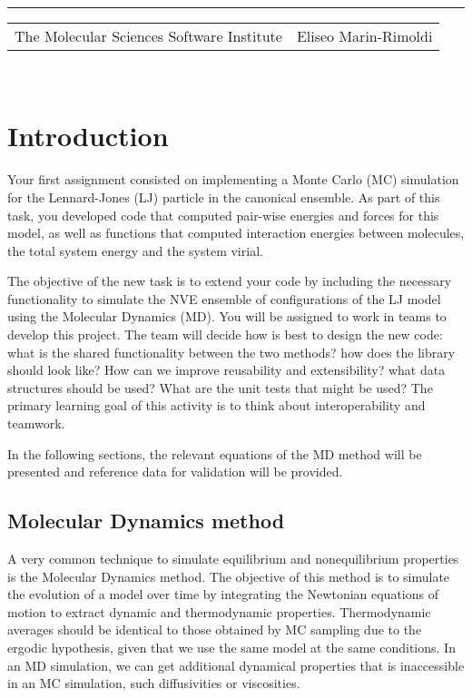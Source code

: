 \documentclass[aip,jcp,preprint,superscriptaddress,floatfix]{revtex4-1}
\renewcommand{\title}[1]{\textbf{\large{#1}}\\}
\newcommand{\leftright}[2]{\begin{tabularx}{\textwidth}{X>{\raggedleft}X}#1%
& #2\\\end{tabularx}\\[-1cm]}
\begin{document}
\title{ }
\rule{\textwidth}{1pt}
\leftright{The Molecular Sciences Software Institute}{Eliseo Marin-Rimoldi} %

\bigskip

\section{Introduction}

Your first assignment consisted on implementing a Monte Carlo (MC) simulation
for the Lennard-Jones (LJ) particle in the canonical ensemble. 
As part of this task,
you developed code that computed pair-wise energies and forces for this model, 
as well as functions that computed interaction energies between molecules,
the total system energy and the system virial.

The objective of the new task is to extend your code by including the
necessary functionality to simulate the NVE ensemble of configurations 
of the LJ model using the Molecular Dynamics (MD). You will be 
assigned to work in teams to develop this project. The team will
decide how is best to design the new code: what is the shared functionality
between the two methods? how does the library should look like? How can
we improve reusability and extensibility? what data
structures should be used? What are the unit tests 
that might be used? The primary learning goal of this activity 
is to think about interoperability and teamwork.

In the following sections, the relevant equations of the MD 
method will be presented and reference data for validation will be provided.

\subsection{Molecular Dynamics method}

A very common technique to simulate equilibrium and nonequilibrium
properties is the Molecular Dynamics method. 
The objective of this method is to simulate the evolution of a model over time
by integrating the Newtonian equations of motion to 
extract dynamic and thermodynamic properties. Thermodynamic
averages should be identical to those obtained by MC sampling
due to the ergodic hypothesis, given that we use the same model at the
same conditions. In an MD simulation, we can get additional dynamical
properties that is inaccessible in an MC simulation, such diffusivities or 
viscosities. 
\end{document}
